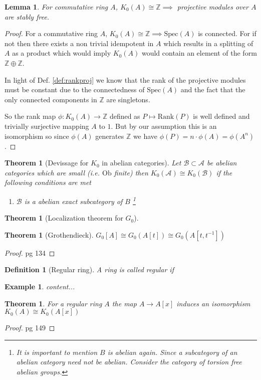 \documentclass[12pt]{article}
\numberwithin{equation}{section}
\newcommand{\Z}{\mathbb{Z}}
\newcounter{dummy} \numberwithin{dummy}{section}
\newtheorem{theorem}[dummy]{Theorem}
\newtheorem{definition}[dummy]{Definition}
\newtheorem{lemma}[dummy]{Lemma}
\newtheorem{example}[dummy]{Example}
\begin{document}
	\begin{lemma} For commutative ring $A$, 
		$K_0(A) \cong \Z \implies $ projective modules over $A$ are stably free.
	\end{lemma}
	\begin{proof}
		For a commutative ring $A$, $K_0(A) \cong \Z \implies \mathrm{Spec}(A)$ is connected. For if not then there exists a non trivial idempotent in $A$ which results in a splitting of $A$ as a product which would imply $K_0(A)$ would contain an element of the form $\Z \oplus \Z $. 
		
		In light of Def. \ref{def:rankproj} we know that the rank of the projective modules must be constant due to the connectedness of $\mathrm{Spec}(A)$ and the fact that the only connected components in $\Z $ are singletons. 
		
		So the rank map $\phi:K_0(A) \to \Z $ defined as $P \mapsto \mathrm{Rank}(P)$ is well defined and trivially surjective mapping $A$ to $1$. But by our assumption this is an isomorphism so since $\phi(A)$ generates $\Z $ we have $\phi(P)=n\cdot \phi(A)=\phi(A^n)$.
	\end{proof}
	
	\begin{theorem}[Devissage for $K_0$ in abelian categories]
		Let $\mathcal B \subset \mathcal A$ be abelian categories which are small (i.e. $\mathrm{Ob}$ finite) then $K_0(\mathcal A) \cong K_0(\mathcal B)$ if the following conditions are met
		\begin{enumerate}
			\item $\mathcal B$ is a abelian exact subcategory of $B$ \footnote{It is important to mention $B$ is abelian again. Since a subcategory of an abelian category need not be abelian. Consider the category of torsion free abelian groups. }
		\end{enumerate}
	\end{theorem}
	
	\begin{theorem}[Localization theorem for $G_0$]
		 
	\end{theorem}
	
	\begin{theorem}[Grothendieck]
		$G_0[A] \cong G_0(A[t]) \cong G_0(A[t,t^{-1}])$
	\end{theorem}
	\begin{proof}
		pg 134
	\end{proof}
	
	
	\begin{definition}[Regular ring] A ring is called regular if
	\end{definition}
	\begin{example}
		content...
	\end{example}
	\begin{theorem}\label{extensionk0iscong}
		For a regular ring $A$ the map $A \to A[x]$ induces an isomorphism $K_0(A) \cong K_0(A[x])$ 
	\end{theorem}
	\begin{proof}
		pg 149
	\end{proof}
	
\end{document}
